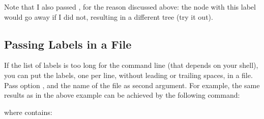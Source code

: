 
Note that I also passed , for the reason discussed
above: the node with this label would go away if I did not, resulting in a
different tree (try it out).

\subsection{Passing Labels in a File}

If the list of labels is too long for the command line (that depends on your
shell), you can put the labels, one per line, without leading or trailing
spaces, in a file. Pass option , and the name of the file as second
argument. For example, the same results as in the above example can be achieved
by the following command:


where  contains:

\startnarrower
{}
\stopnarrower


